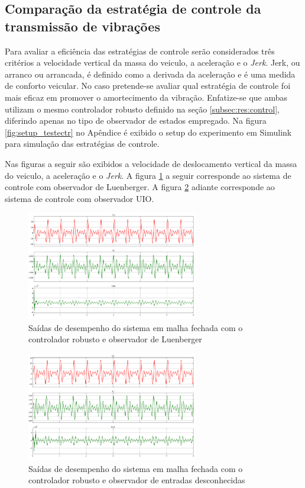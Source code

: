 \subsection{Comparação da estratégia de controle da transmissão de vibrações}
Para avaliar a eficiência das estratégias de controle serão considerados três critérios a velocidade vertical da massa do veiculo, a aceleração e o \emph{Jerk}. Jerk, ou arranco ou arrancada, é definido como a derivada da aceleração e é uma medida de conforto veicular. No caso pretende-se avaliar qual estratégia de controle foi mais eficaz em promover o amortecimento da vibração. Enfatize-se que ambas utilizam o mesmo controlador robusto definido na seção \ref{subsec:res:control}, diferindo apenas no tipo de observador de estados empregado.
Na figura \ref{fig:setup_testectr} no Apêndice é exibido o setup do experimento em Simulink para simulação das estratégias de controle.

Nas figuras a seguir são exibidos a velocidade de deslocamento vertical da massa do veiculo, a aceleração e o \emph{Jerk}. A figura \ref{fig:eval_cntrol_LUE} a seguir corresponde ao sistema de controle com observador de Luenberger. A figura \ref{fig:eval_cntrol_UIO} adiante corresponde ao sistema de controle com observador UIO.
\FloatBarrier
\begin{figure}[htbp]
    \begin{centering}
    \includegraphics[width=7.5cm]{img/eval_cntrol_LUE.png} 
    \caption{Saídas de desempenho do sistema em malha fechada com o controlador robusto e observador de Luenberger}
    \label{fig:eval_cntrol_LUE}
    \end{centering}
\end{figure}
\FloatBarrier

\begin{figure}[htbp]
    \begin{centering}
    \includegraphics[width=7.5cm]{img/eval_cntrol_UIO.png} 
    \caption{Saídas de desempenho do sistema em malha fechada com o controlador robusto e observador de entradas desconhecidas}
    \label{fig:eval_cntrol_UIO}
    \end{centering}
\end{figure}
\FloatBarrier

